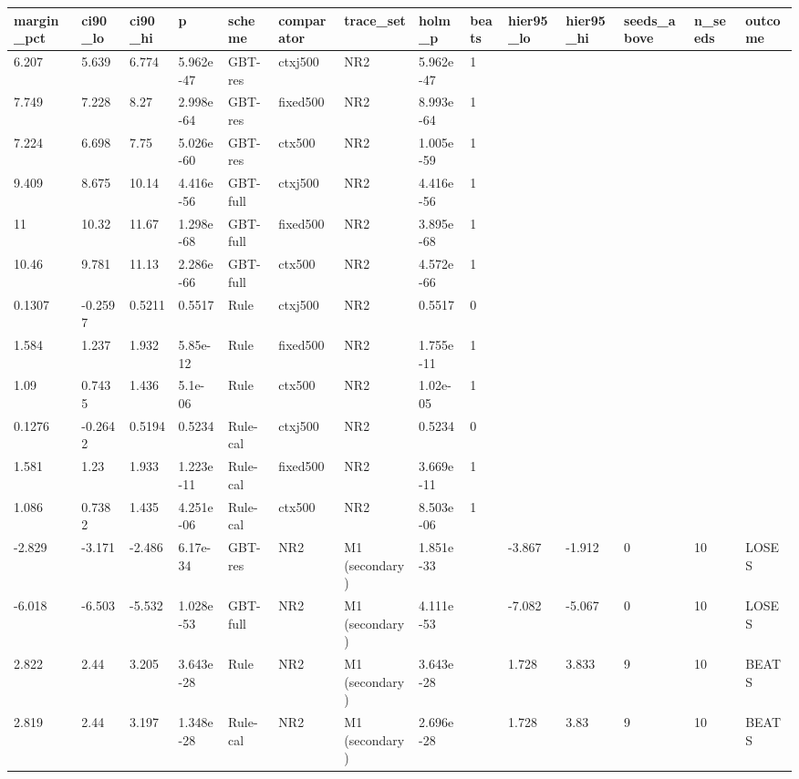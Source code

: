 \documentclass[10pt]{article}
\begin{document}
\begin{landscape}
\begin{longtable}{@{}llllllllllllll@{}}
\midrule
\endfirsthead
\toprule
\textbf{margin\_pct} & \textbf{ci90\_lo} & \textbf{ci90\_hi} & \textbf{p} & \textbf{scheme} & \textbf{comparator} & \textbf{trace\_set} & \textbf{holm\_p} & \textbf{beats} & \textbf{hier95\_lo} & \textbf{hier95\_hi} & \textbf{seeds\_above} & \textbf{n\_seeds} & \textbf{outcome} \\
\midrule
\endhead
6.207 & 5.639 & 6.774 & 5.962e-47 & GBT-res & ctxj500 & NR2 & 5.962e-47 & 1 &  &  &  &  &  \\
7.749 & 7.228 & 8.27 & 2.998e-64 & GBT-res & fixed500 & NR2 & 8.993e-64 & 1 &  &  &  &  &  \\
7.224 & 6.698 & 7.75 & 5.026e-60 & GBT-res & ctx500 & NR2 & 1.005e-59 & 1 &  &  &  &  &  \\
9.409 & 8.675 & 10.14 & 4.416e-56 & GBT-full & ctxj500 & NR2 & 4.416e-56 & 1 &  &  &  &  &  \\
11 & 10.32 & 11.67 & 1.298e-68 & GBT-full & fixed500 & NR2 & 3.895e-68 & 1 &  &  &  &  &  \\
10.46 & 9.781 & 11.13 & 2.286e-66 & GBT-full & ctx500 & NR2 & 4.572e-66 & 1 &  &  &  &  &  \\
0.1307 & -0.2597 & 0.5211 & 0.5517 & Rule & ctxj500 & NR2 & 0.5517 & 0 &  &  &  &  &  \\
1.584 & 1.237 & 1.932 & 5.85e-12 & Rule & fixed500 & NR2 & 1.755e-11 & 1 &  &  &  &  &  \\
1.09 & 0.7435 & 1.436 & 5.1e-06 & Rule & ctx500 & NR2 & 1.02e-05 & 1 &  &  &  &  &  \\
0.1276 & -0.2642 & 0.5194 & 0.5234 & Rule-cal & ctxj500 & NR2 & 0.5234 & 0 &  &  &  &  &  \\
1.581 & 1.23 & 1.933 & 1.223e-11 & Rule-cal & fixed500 & NR2 & 3.669e-11 & 1 &  &  &  &  &  \\
1.086 & 0.7382 & 1.435 & 4.251e-06 & Rule-cal & ctx500 & NR2 & 8.503e-06 & 1 &  &  &  &  &  \\
-2.829 & -3.171 & -2.486 & 6.17e-34 & GBT-res & NR2 & M1 (secondary) & 1.851e-33 &  & -3.867 & -1.912 & 0 & 10 & LOSES \\
-6.018 & -6.503 & -5.532 & 1.028e-53 & GBT-full & NR2 & M1 (secondary) & 4.111e-53 &  & -7.082 & -5.067 & 0 & 10 & LOSES \\
2.822 & 2.44 & 3.205 & 3.643e-28 & Rule & NR2 & M1 (secondary) & 3.643e-28 &  & 1.728 & 3.833 & 9 & 10 & BEATS \\
2.819 & 2.44 & 3.197 & 1.348e-28 & Rule-cal & NR2 & M1 (secondary) & 2.696e-28 &  & 1.728 & 3.83 & 9 & 10 & BEATS \\

\end{longtable}
\end{landscape}
\end{document}
